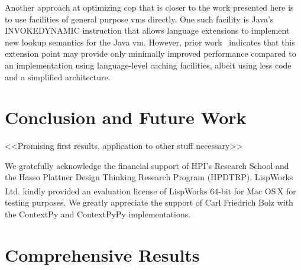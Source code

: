 \documentclass[preprint,english,10pt,nonatbib]{sigplanconf}
\begin{document}
Another approach at optimizing \ac{cop} that is closer to the work presented
here is to use facilities of general purpose \acp{vm} directly. One such
facility is Java's INVOKEDYNAMIC instruction that allows language extensions to
implement new lookup semantics for the Java \ac{vm}. However, prior
work~\cite{appeltauer2010layered} indicates that this extension point may
provide only minimally improved performance compared to an implementation using
language-level caching facilities, albeit using less code and a simplified
architecture.

\section{Conclusion and Future Work}


<<Promising first results, application to other stuff necessary>>

\acks
We gratefully acknowledge the financial support of HPI's Research School and
the Hasso Plattner Design Thinking Research Program (HPDTRP).
LispWorks Ltd. kindly provided an evaluation license of
LispWorks\textsuperscript{\textregistered} 64-bit for Mac OS\,X for testing
purposes. We greatly appreciate the support of Carl Friedrich Bolz with the
ContextPy and ContextPyPy implementations.
\printbibliography
\appendix
{}
\section{Comprehensive Results}


\end{document}
